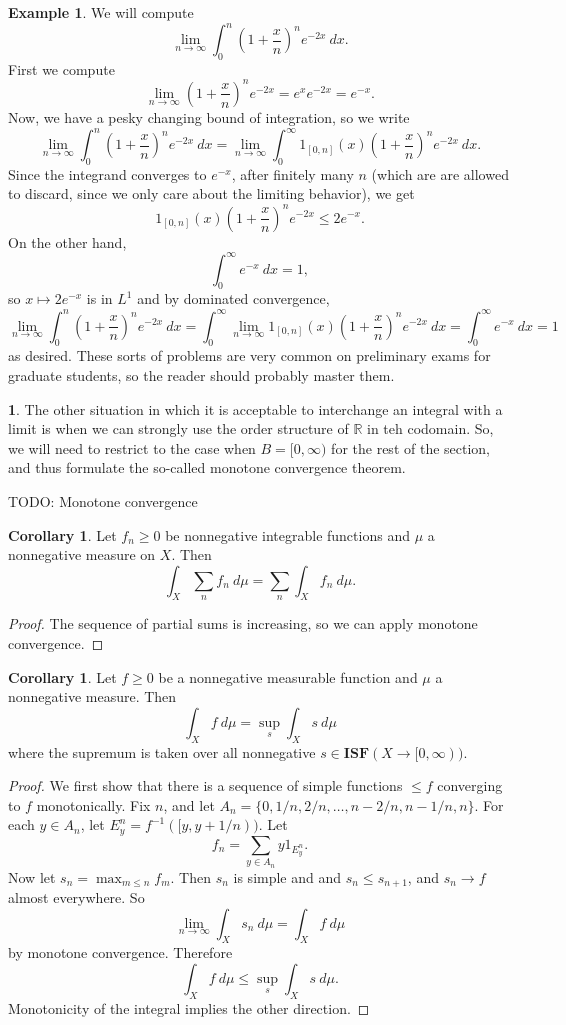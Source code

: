\documentclass[12pt]{book}
\newcommand{\RR}{\mathbb{R}}
\newcommand{\ISF}{\mathbf{ISF}}
\theoremstyle{definition}
\newtheorem{corollary}[theorem]{Corollary}
\newtheorem{subsec}[theorem]{}
\newtheorem{example}[theorem]{Example}
\begin{document}
\begin{example}
We will compute
$$\lim_{n \to \infty} \int_0^n \left(1 + \frac{x}{n}\right)^n e^{-2x} ~dx.$$
First we compute
$$\lim_{n \to \infty} \left(1 + \frac{x}{n}\right)^n e^{-2x} = e^x e^{-2x} = e^{-x}.$$
Now, we have a pesky changing bound of integration, so we write
$$\lim_{n \to \infty} \int_0^n \left(1 + \frac{x}{n}\right)^n e^{-2x} ~dx = \lim_{n \to \infty} \int_0^\infty 1_{[0, n]}(x) \left(1 + \frac{x}{n}\right)^n e^{-2x} ~dx.$$
Since the integrand converges to $e^{-x}$, after finitely many $n$ (which are are allowed to discard, since we only care about the limiting behavior), we get
$$1_{[0, n]}(x) \left(1 + \frac{x}{n}\right)^n e^{-2x} \leq 2e^{-x}.$$
On the other hand,
$$\int_0^\infty e^{-x} ~dx = 1,$$
so $x \mapsto 2e^{-x}$ is in $L^1$ and by dominated convergence,
$$\lim_{n \to \infty} \int_0^n \left(1 + \frac{x}{n}\right)^n e^{-2x} ~dx = \int_0^\infty \lim_{n \to \infty} 1_{[0, n]}(x) \left(1 + \frac{x}{n}\right)^n e^{-2x} ~dx = \int_0^\infty e^{-x} ~dx = 1$$
as desired.
These sorts of problems are very common on preliminary exams for graduate students, so the reader should probably master them.
\end{example}

\begin{subsec}
The other situation in which it is acceptable to interchange an integral with a limit is when we can strongly use the order structure of $\RR$ in teh codomain.
So, we will need to restrict to the case when $B = [0, \infty)$ for the rest of the section, and thus formulate the so-called monotone convergence theorem.
\end{subsec}

TODO: Monotone convergence

\begin{corollary}
\label{positive summation}
Let $f_n \geq 0$ be nonnegative integrable functions and $\mu$ a nonnegative measure on $X$. Then
$$\int_X \sum_n f_n~d\mu = \sum_n \int_X f_n~d\mu.$$
\end{corollary}
\begin{proof}
The sequence of partial sums is increasing, so we can apply monotone convergence.
\end{proof}

\begin{corollary}
Let $f \geq 0$ be a nonnegative measurable function and $\mu$ a nonnegative measure. Then
$$\int_X f~d\mu = \sup_s \int_X s~d\mu$$
where the supremum is taken over all nonnegative $s \in \ISF(X \to [0, \infty))$.
\end{corollary}
\begin{proof}
We first show that there is a sequence of simple functions $\leq f$ converging to $f$ monotonically.
Fix $n$, and let $A_n = \{0, 1/n, 2/n, \dots, n - 2/n, n - 1/n, n\}$.
For each $y \in A_n$, let $E_y^n = f^{-1}([y, y + 1/n))$. Let
$$f_n = \sum_{y \in A_n} y1_{E_y^n}.$$
Now let $s_n = \max_{m \leq n} f_m$.
Then $s_n$ is simple and and $s_n \leq s_{n+1}$, and $s_n \to f$ almost everywhere.
So
$$\lim_{n \to \infty} \int_X s_n~d\mu = \int_X f~d\mu$$
by monotone convergence. Therefore
$$\int_X f~d\mu \leq \sup_s \int_X s~d\mu.$$
Monotonicity of the integral implies the other direction.
\end{proof}
\end{document}
